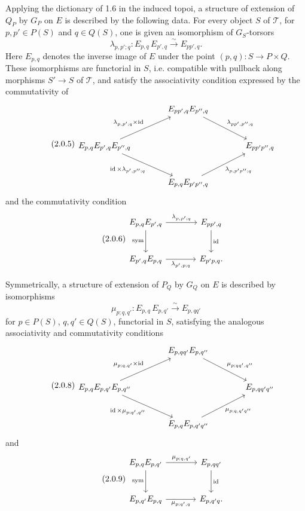 \documentclass[11pt]{article}
\providecommand{\id}{\operatorname{id}}
\begin{document}
Applying the dictionary of 1.6 in the induced topoi, a structure of extension of \(Q_P\) by \(G_P\) on \(E\) is described by the following data.  For every object \(S\) of \(\mathcal T\), for \(p,p'\in P(S)\) and \(q\in Q(S)\), one is given an isomorphism of \(G_S\)-torsors
\begin{equation}\tag{2.0.4}
  \lambda_{p,p';q}: E_{p,q}\,E_{p',q}\xrightarrow{\sim}E_{pp',q}.
\end{equation}
Here \(E_{p,q}\) denotes the inverse image of \(E\) under the point \((p,q):S\to P\times Q\).  These isomorphisms are functorial in \(S\), i.e. compatible with pullback along morphisms \(S'\to S\) of \(\mathcal T\), and satisfy the associativity condition expressed by the commutativity of
\begin{equation}\tag{2.0.5}
\begin{tikzcd}[column sep=large,row sep=large]
& E_{pp',q}E_{p'',q}\arrow[dr,"\lambda_{pp',p'';q}"]&\\
E_{p,q}E_{p',q}E_{p'',q}
\arrow[ur,"\lambda_{p,p';q}\times\id"]
\arrow[dr,"\id\times\lambda_{p',p'';q}"']&&E_{pp'p'',q}\\
& E_{p,q}E_{p'p'',q}\arrow[ur,"\lambda_{p,p'p'';q}"']&
\end{tikzcd}
\end{equation}
and the commutativity condition
\begin{equation}\tag{2.0.6}
\begin{tikzcd}[column sep=large,row sep=large]
E_{p,q}E_{p',q}\arrow[r,"\lambda_{p,p';q}"]\arrow[d,"\sym"']&E_{pp',q}\arrow[d,"\id"]\\
E_{p',q}E_{p,q}\arrow[r,"\lambda_{p',p;q}"']&E_{p'p,q}.
\end{tikzcd}
\end{equation}

Symmetrically, a structure of extension of \(P_Q\) by \(G_Q\) on \(E\) is described by isomorphisms
\begin{equation}\tag{2.0.7}
  \mu_{p;q,q'}:E_{p,q}\,E_{p,q'}\xrightarrow{\sim}E_{p,qq'}
\end{equation}
for \(p\in P(S)\), \(q,q'\in Q(S)\), functorial in \(S\), satisfying the analogous associativity and commutativity conditions
\begin{equation}\tag{2.0.8}
\begin{tikzcd}[column sep=large,row sep=large]
& E_{p,qq'}E_{p,q''}\arrow[dr,"\mu_{p;qq',q''}"]&\\
E_{p,q}E_{p,q'}E_{p,q''}
\arrow[ur,"\mu_{p;q,q'}\times\id"]
\arrow[dr,"\id\times\mu_{p;q',q''}"']&&E_{p,qq'q''}\\
& E_{p,q}E_{p,q'q''}\arrow[ur,"\mu_{p;q,q'q''}"']&
\end{tikzcd}
\end{equation}
and
\begin{equation}\tag{2.0.9}
\begin{tikzcd}[column sep=large,row sep=large]
E_{p,q}E_{p,q'}\arrow[r,"\mu_{p;q,q'}"]\arrow[d,"\sym"']&E_{p,qq'}\arrow[d,"\id"]\\
E_{p,q'}E_{p,q}\arrow[r,"\mu_{p;q',q}"']&E_{p,q'q}.
\end{tikzcd}
\end{equation}
\end{document}
